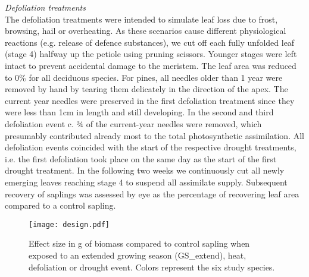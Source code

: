 \documentclass{article}
\begin{document}
	\textit{Defoliation treatments} \\
	The defoliation treatments were intended to simulate leaf loss due to frost, browsing, hail or overheating. As these scenarios cause different physiological reactions (e.g. release of defence substances), we cut off each fully unfolded leaf (stage 4) halfway up the petiole using pruning scissors. Younger stages were left intact to prevent accidental damage to the meristem. The leaf area was reduced to 0\% for all deciduous species. For pines, all needles older than 1 year were removed by hand by tearing them delicately in the direction of the apex. The current year needles were preserved in the first defoliation treatment since they were less than 1cm in length and still developing. In the second and third defoliation event c. ¾ of the current-year needles were removed, which presumably contributed already most to the total photosynthetic assimilation. All defoliation events coincided with the start of the respective drought treatments, i.e. the first defoliation took place on the same day as the start of the first drought treatment. In the following two weeks we continuously cut all newly emerging leaves reaching stage 4 to suspend all assimilate supply. %
	Subsequent recovery of saplings was assessed by eye as the percentage of recovering leaf area compared to a control sapling. 
	
	
	
	
		\begin{figure}[H]
		\centering
		\texttt{[image: design.pdf]} 
		\caption{Effect size in g of biomass compared to control sapling when exposed to an extended growing season (GS\_extend), heat, defoliation or drought event. Colors represent the six study species. }
		\label{fig:fig_1xxx}
	\end{figure}
	
\end{document}
